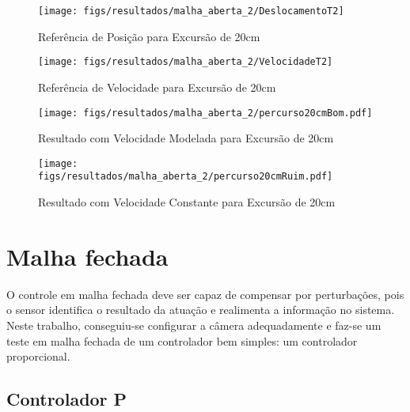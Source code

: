 \begin{figure}[!htb]
    \centering
    \begin{minipage}{.45\textwidth}
        \centering
        \texttt{[image: figs/resultados/malha\_aberta\_2/DeslocamentoT2]}
        \caption{Referência de Posição para Excursão de 20cm}
        \label{DeslocamentoT2}
    \end{minipage}%
    \hspace{0.1cm}
    \begin{minipage}{0.45\textwidth}
        \centering
        \texttt{[image: figs/resultados/malha\_aberta\_2/VelocidadeT2]}
        \caption{Referência de Velocidade para Excursão de 20cm}
        \label{VelocidadeT2}
    \end{minipage}
\end{figure}

\begin{figure}[!htb]
    \centering
    \begin{minipage}{.45\textwidth}
        \centering
        \texttt{[image: figs/resultados/malha\_aberta\_2/percurso20cmBom.pdf]}
        \caption{Resultado com Velocidade Modelada para Excursão de 20cm}
        \label{percurso20cmBom}
    \end{minipage}%
    \hspace{0.1cm}
    \begin{minipage}{0.45\textwidth}
        \centering
        \texttt{[image: figs/resultados/malha\_aberta\_2/percurso20cmRuim.pdf]}
        \caption{Resultado com Velocidade Constante para Excursão de 20cm}
        \label{percurso20cmRuim}
    \end{minipage}
\end{figure}






\section{Malha fechada\label{malhafechadaSection}}
O controle em malha fechada deve ser capaz de compensar por perturbações, pois o sensor identifica o resultado da atuação e realimenta a informação no sistema. Neste trabalho, conseguiu-se configurar a câmera adequadamente e faz-se um teste em malha fechada de um controlador bem simples: um controlador proporcional.

\subsection{Controlador P}

